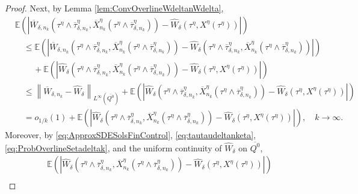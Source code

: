\documentclass[amscd,amssymb,11pt]{article}
\numberwithin{theorem}{section}
\numberwithin{equation}{section}
\begin{document}
\begin{proof}
Next, by Lemma \ref{lem:ConvOverlineWdeltanWdelta},
\begin{align*}
&\mathbb{E}\left(\left|\overline{W}_{\delta,n_{k}}\left(\tau^{\eta}\wedge\overline{\tau}_{\delta,n_{k}}^{\eta},\overline{X}_{n_{k}}^{\eta}\left(\tau^{\eta}\wedge\overline{\tau}_{\delta,n_{k}}^{\eta}\right)\right)-\widehat{W}_{\delta}\left(\tau^{\eta},X^{\eta}\left(\tau^{\eta}\right)\right)\right|\right)\\
&\quad\leq\mathbb{E}\left(\left|\overline{W}_{\delta,n_{k}}\left(\tau^{\eta}\wedge\overline{\tau}_{\delta,n_{k}}^{\eta},\overline{X}_{n_{k}}^{\eta}\left(\tau^{\eta}\wedge\overline{\tau}_{\delta,n_{k}}^{\eta}\right)\right)-\widehat{W}_{\delta}\left(\tau^{\eta}\wedge\overline{\tau}_{\delta,n_{k}}^{\eta},\overline{X}_{n_{k}}^{\eta}\left(\tau^{\eta}\wedge\overline{\tau}_{\delta,n_{k}}^{\eta}\right)\right)\right|\right)\\
&\qquad\,+\mathbb{E}\left(\left|\widehat{W}_{\delta}\left(\tau^{\eta}\wedge\overline{\tau}_{\delta,n_{k}}^{\eta},\overline{X}_{n_{k}}^{\eta}\left(\tau^{\eta}\wedge\overline{\tau}_{\delta,n_{k}}^{\eta}\right)\right)-\widehat{W}_{\delta}\left(\tau^{\eta},X^{\eta}\left(\tau^{\eta}\right)\right)\right|\right)\\
&\quad\leq\left\|\overline{W}_{\delta,n_k}-\widehat{W}_{\delta}\right\|_{L^{\infty}(\overline{Q^0})}+\mathbb{E}\left(\left|\widehat{W}_{\delta}\left(\tau^{\eta}\wedge\overline{\tau}_{\delta,n_{k}}^{\eta},\overline{X}_{n_{k}}^{\eta}\left(\tau^{\eta}\wedge\overline{\tau}_{\delta,n_{k}}^{\eta}\right)\right)-\widehat{W}_{\delta}\left(\tau^{\eta},X^{\eta}\left(\tau^{\eta}\right)\right)\right|\right)\\
&\quad =o_{1/k}(1)+\mathbb{E}\left(\left|\widehat{W}_{\delta}\left(\tau^{\eta}\wedge\overline{\tau}_{\delta,n_{k}}^{\eta},\overline{X}_{n_{k}}^{\eta}\left(\tau^{\eta}\wedge\overline{\tau}_{\delta,n_{k}}^{\eta}\right)\right)-\widehat{W}_{\delta}\left(\tau^{\eta},X^{\eta}\left(\tau^{\eta}\right)\right)\right|\right),\quad k\rightarrow\infty.
\end{align*}
Moreover, by \eqref{eq:ApproxSDESolsFinControl}, \eqref{eq:tautaudeltanketa}, \eqref{eq:ProbOverlineSetadeltak}, and the uniform continuity of $\widehat{W}_{\delta}$ on $\overline{{Q}^{0}}$,
\begin{align*}
&\mathbb{E}\left(\left|\widehat{W}_{\delta}\left(\tau^{\eta}\wedge\overline{\tau}_{\delta,n_{k}}^{\eta},\overline{X}_{n_{k}}^{\eta}\left(\tau^{\eta}\wedge\overline{\tau}_{\delta,n_{k}}^{\eta}\right)\right)-\widehat{W}_{\delta}\left(\tau^{\eta},X^{\eta}\left(\tau^{\eta}\right)\right)\right|\right)\\

\end{align*}
\end{proof}
\end{document}
